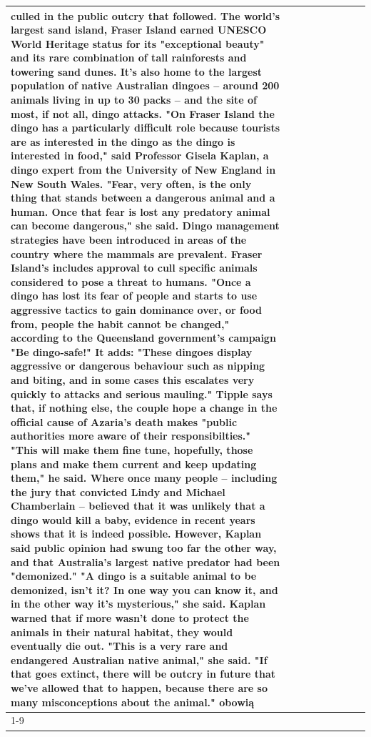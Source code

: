 \begin{table}[H]
\begin{tabular}{lllrlllll}
culled in the public outcry that followed. The world's largest sand island, Fraser Island earned UNESCO World Heritage status for its "exceptional beauty" and its rare combination of tall rainforests and towering sand dunes. It's also home to the largest population of native Australian dingoes -- around 200 animals living in up to 30 packs -- and the site of most, if not all, dingo attacks. "On Fraser Island the dingo has a particularly difficult role because tourists are as interested in the dingo as the dingo is interested in food," said Professor Gisela Kaplan, a dingo expert from the University of New England in New South Wales. "Fear, very often, is the only thing that stands between a dangerous animal and a human. Once that fear is lost any predatory animal can become dangerous," she said. Dingo management strategies have been introduced in areas of the country where the mammals are prevalent. Fraser Island's includes approval to cull specific animals considered to pose a threat to humans. "Once a dingo has lost its fear of people and starts to use aggressive tactics to gain dominance over, or food from, people the habit cannot be changed," according to the Queensland government's campaign "Be dingo-safe!" It adds: "These dingoes display aggressive or dangerous behaviour such as nipping and biting, and in some cases this escalates very quickly to attacks and serious mauling." Tipple says that, if nothing else, the couple hope a change in the official cause of Azaria's death makes "public authorities more aware of their responsibilties." "This will make them fine tune, hopefully, those plans and make them current and keep updating them," he said. Where once many people -- including the jury that convicted Lindy and Michael Chamberlain -- believed that it was unlikely that a dingo would kill a baby, evidence in recent years shows that it is indeed possible. However, Kaplan said public opinion had swung too far the other way, and that Australia's largest native predator had been "demonized." "A dingo is a suitable animal to be demonized, isn't it? In one way you can know it, and in the other way it's mysterious," she said. Kaplan warned that if more wasn't done to protect the animals in their natural habitat, they would eventually die out. "This is a very rare and endangered Australian native animal," she said. "If that goes extinct, there will be outcry in future that we've allowed that to happen, because there are so many misconceptions about the animal." obowią \\
\cline{1-9}

\end{tabular}
\end{table}
